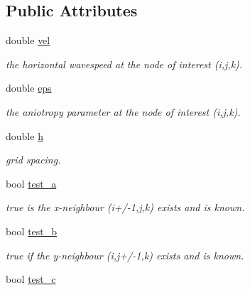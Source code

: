 \subsection*{Public Attributes}
\begin{DoxyCompactItemize}
\item 
\hypertarget{class_tetra_a97520e389f35a37ca10bdeacd72f16c2}{}double \hyperlink{class_tetra_a97520e389f35a37ca10bdeacd72f16c2}{vel}\label{class_tetra_a97520e389f35a37ca10bdeacd72f16c2}

\begin{DoxyCompactList}\small\item\em the horizontal wavespeed at the node of interest (i,j,k). \end{DoxyCompactList}\item 
\hypertarget{class_tetra_a28326c3274d8efa05743fc416a80fee0}{}double \hyperlink{class_tetra_a28326c3274d8efa05743fc416a80fee0}{eps}\label{class_tetra_a28326c3274d8efa05743fc416a80fee0}

\begin{DoxyCompactList}\small\item\em the aniotropy parameter at the node of interest (i,j,k). \end{DoxyCompactList}\item 
\hypertarget{class_tetra_adb85980e5e01c530760eca80f59d2a70}{}double \hyperlink{class_tetra_adb85980e5e01c530760eca80f59d2a70}{h}\label{class_tetra_adb85980e5e01c530760eca80f59d2a70}

\begin{DoxyCompactList}\small\item\em grid spacing. \end{DoxyCompactList}\item 
\hypertarget{class_tetra_a025e73df54f5aef0f573e98b70bba674}{}bool \hyperlink{class_tetra_a025e73df54f5aef0f573e98b70bba674}{test\+\_\+a}\label{class_tetra_a025e73df54f5aef0f573e98b70bba674}

\begin{DoxyCompactList}\small\item\em true is the x-\/neighbour (i+/-\/1,j,k) exists and is known. \end{DoxyCompactList}\item 
\hypertarget{class_tetra_a2b56ec0c512ec59a998e5493a07a6f23}{}bool \hyperlink{class_tetra_a2b56ec0c512ec59a998e5493a07a6f23}{test\+\_\+b}\label{class_tetra_a2b56ec0c512ec59a998e5493a07a6f23}

\begin{DoxyCompactList}\small\item\em true if the y-\/neighbour (i,j+/-\/1,k) exists and is known. \end{DoxyCompactList}\item 
\hypertarget{class_tetra_ab38893ea7447e022b1158619e26c36bb}{}bool \hyperlink{class_tetra_ab38893ea7447e022b1158619e26c36bb}{test\+\_\+c}\label{class_tetra_ab38893ea7447e022b1158619e26c36bb}


\end{DoxyCompactItemize}
